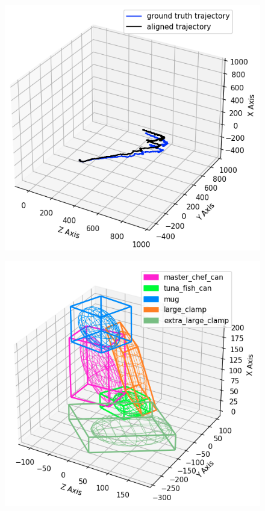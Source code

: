 \documentclass[report.tex]{subfiles}
\begin{document}
\begin{itemize}
\begin{figure}[H]
\centering
\begin{minipage}{.45\textwidth}
  \centering
  \includegraphics[width=\textwidth]{Images/48_batch_traj.png}
  \label{fig:batch_traj_48}
\end{minipage}%
\begin{minipage}{.45\textwidth}
  \centering
  \includegraphics[width=\textwidth]{Images/48_batch_obj.png}
  \label{fig:batch_obj_48}
\end{minipage}
\end{figure}


\end{itemize}
\end{document}

